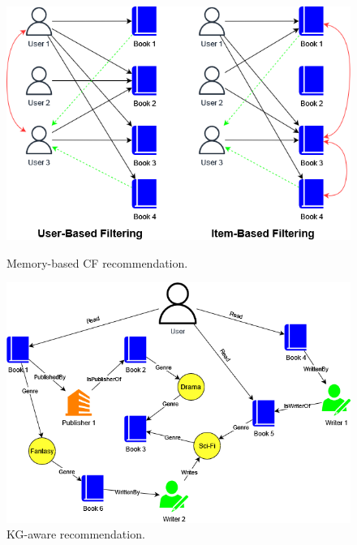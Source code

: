 \documentclass{llncs}
\begin{document}
\begin{figure}[H]
\vspace{-1em}
\centering
\begin{minipage}{0.48\textwidth}
  \centering
  \includegraphics[width=\linewidth]{img/collaborative_example.png}
  \caption{Memory-based CF recommendation.}
  \label{fig:collaborative_example}
\end{minipage}\hfill
\begin{minipage}{0.48\textwidth}
  \centering
  \includegraphics[width=\linewidth]{img/knowledge_graph_example.png}
  \caption{KG-aware recommendation.}
  \label{fig:knowledge_graph_example}
\end{minipage}
\vspace{-1em}
\end{figure}
%
\end{document}
